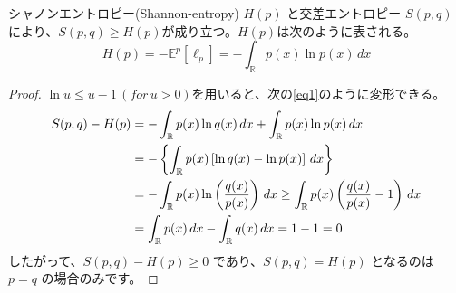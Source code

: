 \documentclass[a4paper]{jsarticle}%
\begin{document}
\begin{prop}\label{prop:cross-entropy}
シャノンエントロピー(Shannon-entropy) \footnotemark[2]$H(p)$ と交差エントロピー $S(p, q)$により、$S(p,q)\geq H(p)$が成り立つ。$H(p)$は次のように表される。
\[
H(p) = -\mathbb{E}^p[\ell_p] = - \int_{\mathbb{R}} p(x) \ln p(x) \, dx
\]
\begin{proof}
$\ln u\leq u-1\, (for\, u >0)$を用いると、次の\eqref{eq1}のように変形できる。
\begin{align}
S(p, q) - H(p) &= -\int_{\mathbb{R}} p(x) \ln q(x) \, dx + \int_{\mathbb{R}} p(x) \ln p(x) \, dx \notag\\
&= -\left\{\int_{\mathbb{R}} p(x)\left[\ln q(x)-\ln p(x)\right]\, dx\right\}\notag\\
&= -\int_{\mathbb{R}} p(x)\ln \left(\dfrac{q(x)}{p(x)}\right)\, dx\geq \int_{\mathbb{R}} p(x) \left(\dfrac{q(x)}{p(x)}-1\right)\, dx \label{eq1}\\
&= \int_{\mathbb{R}} p(x)\, dx -\int_{\mathbb{R}} q(x)\, dx =1-1= 0 \notag
\end{align}
したがって、\( S(p, q) - H(p) \geq 0 \) であり、\( S(p, q) = H(p) \) となるのは \( p = q \) の場合のみです。
\end{proof}
\end{prop}
\end{document}
